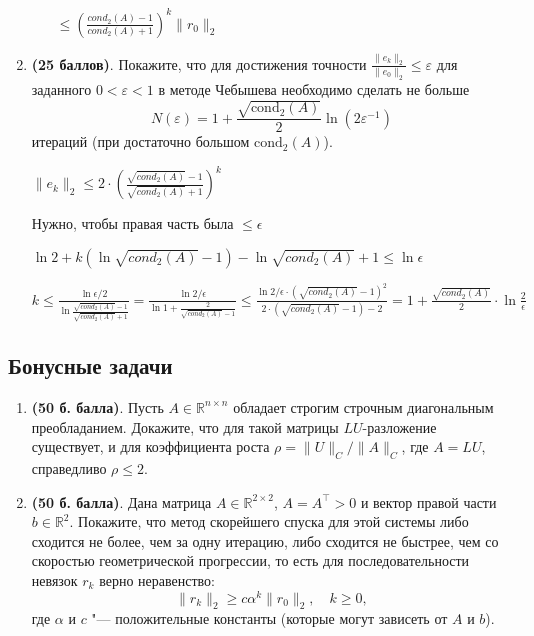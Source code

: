 \documentclass[a4paper, 11pt]{article}
\newcommand{\prob}[1]{\item \textbf{(#1 баллов)}.}
\begin{document}
\begin{enumerate}
\begin{enumerate}
				$\leqslant (\frac{cond_2(A) - 1}{cond_2(A) + 1})^k \|r_0\|_2$
				
			
		\end{enumerate}
		\prob{25} Покажите, что для достижения точности $\frac{\|e_k\|_2}{\|e_0\|_2} \leq \varepsilon$ для заданного $0< \varepsilon < 1$ в методе Чебышева необходимо сделать не больше
		\[
		N(\varepsilon) = 1+ \frac{\sqrt{\mathrm{cond}_2 (A)}}{2} \ln (2\varepsilon^{-1})
		\]
		итераций (при достаточно большом $\mathrm{cond}_2 (A)$). 
		
			$\| e_k \|_2 \leqslant 2 \cdot (\frac{\sqrt{cond_2(A)} - 1}{\sqrt{cond_2(A)} + 1})^k$
			
			
			Нужно, чтобы правая часть была $\leqslant \epsilon$
			
			$\ln{2} + k(\ln{\sqrt{cond_2(A)} - 1}) - \ln{\sqrt{cond_2(A)} + 1} \leqslant \ln \epsilon$
			
			$k \leqslant \frac{\ln{\epsilon / 2}}{\ln{\frac{\sqrt{cond_2(A)} - 1}{\sqrt{cond_2(A)} + 1}}} = \frac{\ln{2/ \epsilon}}{\ln{1 + \frac{2}{\sqrt{cond_2(A)} - 1}}} \leqslant \frac{\ln{2 / \epsilon} \cdot (\sqrt{cond_2(A)} - 1)^2}{2 \cdot (\sqrt{cond_2(A)} - 1) - 2} = 1 + \frac{\sqrt{cond_2(A)}}{2} \cdot \ln{\frac{2}{\epsilon}}$
		
	\end{enumerate}
	
	\subsection*{Бонусные задачи}
	
	
	\begin{enumerate}
		\item \textbf{(50 б. балла)}.   Пусть $A\in\mathbb{R}^{n\times n}$ обладает строгим строчным диагональным преобладанием.
		Докажите, что для такой матрицы $LU$-разложение существует, и для коэффициента роста $\rho = \|U\|_C / \|A\|_C$, где $A=LU$, справедливо $\rho\leq 2$.
		
		\item \textbf{(50 б. балла)}.   Дана матрица $A \in \mathbb{R}^{2\times 2}$, $A = A^\top > 0$ и вектор правой части $b \in \mathbb{R}^2$.
		Покажите, что метод скорейшего спуска для этой системы либо сходится не более, чем за одну итерацию, либо сходится не быстрее, чем со скоростью геометрической прогрессии, то есть для последовательности невязок $r_k$ верно неравенство:
		\[
		\|r_k\|_2 \geq c \alpha^{k} \|r_0\|_2, \quad k \geq 0,
		\]
		где $\alpha$ и $c$ "--- положительные константы (которые могут зависеть от $A$ и $b$).
	\end{enumerate}
	
	
\end{document}
